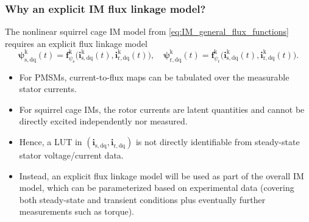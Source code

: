 \begin{frame}
    \frametitle{Why an explicit IM flux linkage model?}
    The nonlinear squirrel cage IM model from \eqref{eq:IM_general_flux_functions} requires an explicit flux linkage model
    \begin{equation}
        \bm{\psi}^\mathrm{k}_\mathrm{s,dq}(t)=\bm{f}^\mathrm{k}_{\psi_\mathrm{s}}\big(\bm{i}^\mathrm{k}_\mathrm{s,dq}(t),\bm{i}^\mathrm{k}_\mathrm{r,dq}(t)\big), \quad
        \bm{\psi}^\mathrm{k}_\mathrm{r,dq}(t)=\bm{f}^\mathrm{k}_{\psi_\mathrm{r}}\big(\bm{i}^\mathrm{k}_\mathrm{s,dq}(t),\bm{i}^\mathrm{k}_\mathrm{r,dq}(t)\big).
        \label{eq:IM_general_flux_functions}
    \end{equation}
    \begin{itemize}
        \item<2-> For PMSMs, current-to-flux maps can be tabulated over the measurable stator currents.
        \item<3-> For squirrel cage IMs, the rotor currents are latent quantities and cannot be directly excited independently nor measured.
        \item<4-> Hence, a LUT in $(\bm{i}_\mathrm{s,dq},\bm{i}_\mathrm{r,dq})$ is not directly identifiable from steady-state stator voltage/current data.
        \item<5-> Instead, an explicit flux linkage model will be used as part of the overall IM model, which can be parameterized based on experimental data (covering both steady-state and transient conditions plus eventually further measurements such as torque).
    \end{itemize}
\end{frame}


